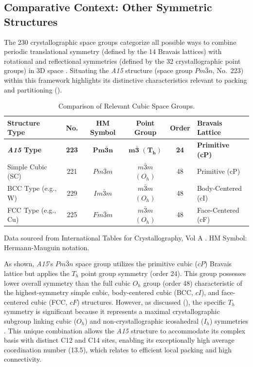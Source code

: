 \documentclass[10pt]{article}
\def\AAAB{\textit{A15}}
\begin{document}
\subsection{Comparative Context: Other Symmetric Structures}\label{subsec-comparison-structures}

The 230 crystallographic space groups categorize all possible ways to combine periodic translational symmetry (defined by the 14 Bravais lattices) with rotational and reflectional symmetries (defined by the 32 crystallographic point groups) in 3D space \cite{ITCVolumeA2016}. Situating the \AAAB{} structure (space group $Pm\bar{3}n$, No.~223) within this framework highlights its distinctive characteristics relevant to packing and partitioning ().

\begin{table}[!ht]
    \centering
    \caption{Comparison of Relevant Cubic Space Groups.}
    \label{tab-spacegroups}
    \begin{tabular}{l c c c c l}
        \toprule
        \textbf{Structure Type} & \textbf{No.} & \textbf{HM Symbol} & \textbf{Point Group} & \textbf{Order} & \textbf{Bravais Lattice} \\
        \midrule
        \textbf{\AAAB{} Type}  & \textbf{223} & $\boldsymbol{Pm\bar{3}n}$ & $\boldsymbol{m\bar{3}}$ $\boldsymbol{(T_h)}$ & \textbf{24} & \textbf{Primitive (cP)} \\ \addlinespace
        Simple Cubic (SC)      & 221          & $Pm\bar{3}m$              & $m\bar{3}m$ $(O_h)$                  & 48             & Primitive (cP) \\
        BCC Type (e.g., W)     & 229          & $Im\bar{3}m$              & $m\bar{3}m$ $(O_h)$                  & 48             & Body-Centered (cI) \\
        FCC Type (e.g., Cu)    & 225          & $Fm\bar{3}m$              & $m\bar{3}m$ $(O_h)$                  & 48             & Face-Centered (cF) \\
        \bottomrule
    \end{tabular}
    \vspace*{0.5ex}
    \par
    \footnotesize Data sourced from International Tables for Crystallography, Vol A \cite{ITCVolumeA2016}. HM Symbol: Hermann-Mauguin notation.
\end{table}

As shown, \AAAB{}'s $Pm\bar{3}n$ space group utilizes the primitive cubic ($cP$) Bravais lattice but applies the $T_h$ point group symmetry (order 24). This group possesses lower overall symmetry than the full cubic $O_h$ group (order 48) characteristic of the highest-symmetry simple cubic, body-centered cubic (BCC, $cI$), and face-centered cubic (FCC, $cF$) structures. However, as discussed (), the specific $T_h$ symmetry is significant because it represents a maximal crystallographic subgroup linking cubic ($O_h$) and non-crystallographic icosahedral ($I_h$) symmetries \cite{CoxeterMoser1972}. This unique combination allows the \AAAB{} structure to accommodate its complex basis with distinct C12 and C14 sites, enabling its exceptionally high average coordination number (13.5), which relates to efficient local packing and high connectivity.
\end{document}
